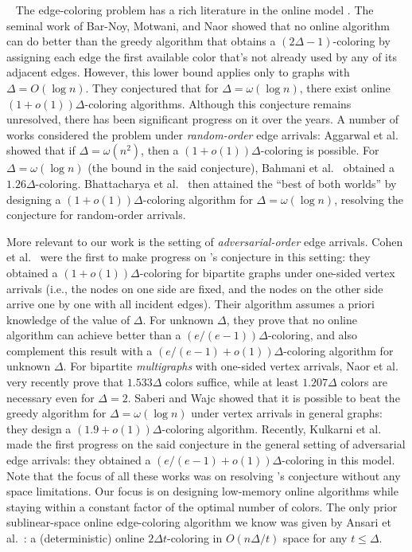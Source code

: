 \documentclass[10pt]{article}
\theoremstyle{definition}\newtheorem{definition}[lemma]{Definition}
\theoremstyle{remark}  \newtheorem*{remark}{Remark}
\newcommand{\mypar}[1]{\medskip\noindent{\bfseries #1.}~}
\begin{document}
\mypar{Online model} The edge-coloring problem has a rich literature in the online model \cite{aggarwal2003switch, AnsariSZ22, BarNoyMN92, BahmaniMM12, BhattacharyaGW21, CohenPW19, FavrholdtM18, FavrholdtN03, Mikkelsen15, Mikkelsen16, NaorSW23, KulkarniLSST22, SaberiW21}. The seminal work of Bar-Noy, Motwani, and Naor \cite{BarNoyMN92} showed that no online algorithm can do better than the greedy algorithm that obtains a $(2\Delta-1)$-coloring by assigning each edge the first available color that's not already used by any of its adjacent edges. However, this lower bound applies only to graphs with $\Delta=O(\log n)$. They conjectured that for $\Delta=\omega(\log n)$, there exist online $(1+o(1))\Delta$-coloring algorithms. Although this conjecture remains unresolved, there has been significant progress on it over the years. A number of works \cite{aggarwal2003switch, BahmaniMM12, BhattacharyaGW21} considered the problem under \emph{random-order} edge arrivals: Aggarwal et al.~\cite{aggarwal2003switch} showed that if $\Delta=\omega(n^2)$, then a $(1+o(1))\Delta$-coloring is possible. For $\Delta=\omega(\log n)$ (the bound in the said conjecture), Bahmani et al.~\cite{BahmaniMM12} obtained a $1.26\Delta$-coloring. Bhattacharya et al.~\cite{BhattacharyaGW21} then attained the ``best of both worlds'' by designing a $(1+o(1))\Delta$-coloring algorithm for $\Delta=\omega(\log n)$, resolving the conjecture for random-order arrivals. 

More relevant to our work is the setting of \emph{adversarial-order} edge arrivals. Cohen et al.~\cite{CohenPW19} were the first to make progress on \cite{BarNoyMN92}'s conjecture in this setting: they obtained a $(1+o(1))\Delta$-coloring for bipartite graphs under one-sided vertex arrivals (i.e., the nodes on one side are fixed, and the nodes on the other side arrive one by one with all incident edges). Their algorithm assumes a priori knowledge of the value of $\Delta$. For unknown $\Delta$, they prove that no online algorithm can achieve better than a $(e/(e-1))\Delta$-coloring, and also complement this result with a $(e/(e-1) +o(1))\Delta$-coloring algorithm for unknown $\Delta$. For  bipartite \emph{multigraphs} with one-sided vertex arrivals, Naor et al.~\cite{NaorSW23} very recently prove that $1.533\Delta$ colors suffice, while at least $1.207\Delta$ colors are necessary even for $\Delta=2$. Saberi and Wajc \cite{SaberiW21} showed that it is possible to beat the greedy algorithm for $\Delta=\omega(\log n)$ under vertex arrivals in general graphs: they design a $(1.9+o(1))\Delta$-coloring algorithm. Recently, Kulkarni et al.~\cite{KulkarniLSST22} made the first progress on the said conjecture in the general setting of adversarial edge arrivals: they obtained a $(e/(e-1) +o(1))\Delta$-coloring in this model. Note that the focus of all these works was on resolving \cite{BarNoyMN92}'s conjecture without any space limitations. Our focus is on designing low-memory online algorithms while staying within a constant factor of the optimal number of colors. The only prior sublinear-space online edge-coloring algorithm we know was given by Ansari et al.~\cite{AnsariSZ22}: a (deterministic) online $2\Delta t$-coloring in $O(n\Delta/t)$ space for any $t\leq \Delta$.
\end{document}
